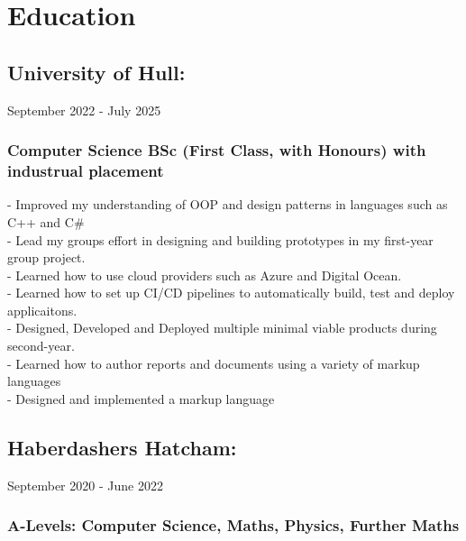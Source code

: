 \section{Education}

\subsection{University of Hull:} September 2022 - July 2025 \\

\subsubsection{Computer Science BSc (First Class, with Honours) with industrual placement}

-\: Improved my understanding of OOP and design patterns in languages such as C++ and C\#\\
-\: Lead my groups effort in designing and building prototypes in my first-year group project. \\
-\: Learned how to use cloud providers such as Azure and Digital Ocean. \\
-\: Learned how to set up CI/CD pipelines to automatically build, test and deploy applicaitons. \\
-\: Designed, Developed and Deployed multiple minimal viable products during second-year. \\
-\: Learned how to author reports and documents using a variety of markup languages \\
-\: Designed and implemented a markup language \\

\vspace{10pt}
\subsection{Haberdashers Hatcham:} September 2020 - June 2022 \\

\subsubsection{A-Levels: Computer Science, Maths, Physics, Further Maths}
\vspace{10pt}

